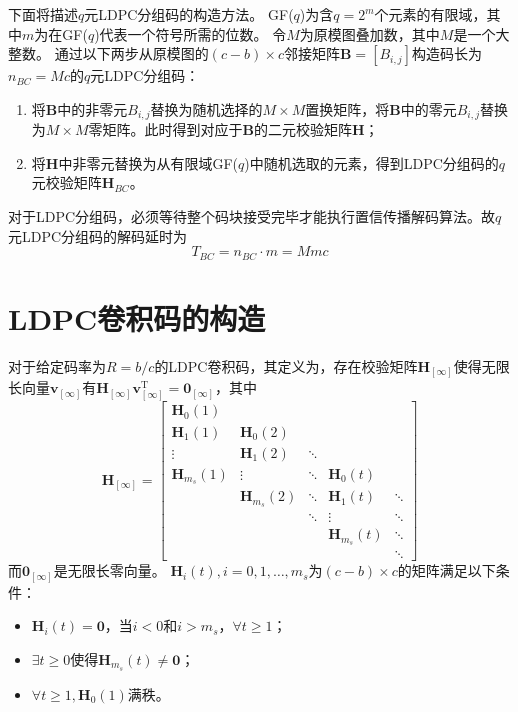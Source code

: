 下面将描述$q$元LDPC分组码的构造方法。
GF($q$)为含$q=2^m$个元素的有限域，其中$m$为在GF($q$)代表一个符号所需的位数。
令$M$为原模图叠加数，其中$M$是一个大整数。
通过以下两步从原模图的$(c-b)\times c$邻接矩阵$\mathbf{B}=[B_{i,j}]$构造码长为$n_{BC}=Mc$的$q$元LDPC分组码：
\begin{enumerate}
\item 将$\mathbf{B}$中的非零元$B_{i,j}$替换为随机选择的$M \times M$置换矩阵，将$\mathbf{B}$中的零元$B_{i,j}$替换为$M \times M$零矩阵。此时得到对应于$\mathbf{B}$的二元校验矩阵$\mathbf{H}$；
\item 将$\mathbf{H}$中非零元替换为从有限域GF($q$)中随机选取的元素，得到LDPC分组码的$q$元校验矩阵$\mathbf{H}_{BC}$。
\end{enumerate}
对于LDPC分组码，必须等待整个码块接受完毕才能执行置信传播解码算法。故$q$元LDPC分组码的解码延时为
\begin{equation}
T_{BC}=n_{BC}\cdot m = Mmc
\end{equation}

\section{LDPC卷积码的构造}

对于给定码率为$R=b/c$的LDPC卷积码，其定义为，存在校验矩阵$\mathbf{H}_{[\infty]}$使得无限长向量$\mathbf{v}_{[\infty]}$有$\mathbf{H}_{[\infty]}\mathbf{v}_{[\infty]}^\text{T} =\mathbf{0}_{[\infty]}$，其中
\begin{equation}
    \mathbf{H}_{[\infty]} = \left[
          \begin{array}{ccccc}
            \mathbf{H}_0(1) & & & & \\
            \mathbf{H}_1(1) & \mathbf{H}_0(2) & & & \\
            \vdots & \mathbf{H}_1(2) & \ddots & & \\
            \mathbf{H}_{m_s}(1) & \vdots & \ddots & \mathbf{H}_0(t) & \\
             & \mathbf{H}_{m_s}(2) & \ddots & \mathbf{H}_1(t) & \ddots\\
             & & \ddots & \vdots & \ddots \\
             & & & \mathbf{H}_{m_s}(t) & \ddots \\
             & & & & \ddots
          \end{array} \right]
\end{equation}
而$\mathbf{0}_{[\infty]}$是无限长零向量。
$\mathbf{H}_i(t),i=0,1,\dots,m_s$为$(c-b)\times c$的矩阵满足以下条件：
\begin{itemize}
\item $\mathbf{H}_i(t)=\mathbf{0}$，当$i<0$和$i>m_s$，$\forall t \geq 1$；
\item $\exists t\geq 0$使得$\mathbf{H}_{m_s}(t) \neq \mathbf{0}$；
\item $\forall t \geq 1,\mathbf{H}_0(1)$满秩。
\end{itemize}

